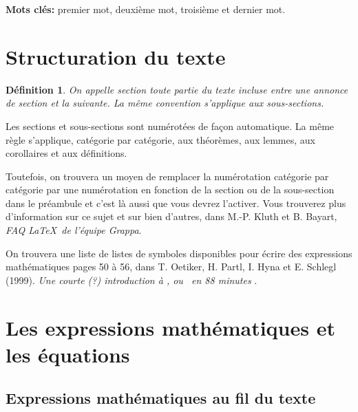 \documentclass[10pt]{article}
\newtheorem{definition}{Définition}
\begin{document}
\textbf{Mots clés: } premier mot, deuxième mot, troisième et dernier mot.

\bigskip

\hypertarget{structuration-du-texte}{%
\section{\texorpdfstring{Structuration du texte
\label{sec1}}{Structuration du texte }}\label{structuration-du-texte}}

\begin{definition}
On appelle section toute partie du texte incluse entre une annonce de section et la suivante. La même convention s'applique aux sous-sections.
\end{definition}

Les sections et sous-sections sont numérotées de façon automatique. La
même règle s'applique, catégorie par catégorie, aux théorèmes, aux
lemmes, aux corollaires et aux définitions.

Toutefois, on trouvera un moyen de remplacer la numérotation catégorie
par catégorie par une numérotation en fonction de la section ou de la
sous-section dans le préambule et c'est là aussi que vous devrez
l'activer. Vous trouverez plus d'information sur ce sujet et sur bien
d'autres, dans M.-P. Kluth et B. Bayart,
\emph{FAQ \LaTeX~de l'équipe Grappa}\cite{faq}.

On trouvera une liste de listes de symboles disponibles pour écrire des
expressions mathématiques pages 50 à 56, dans T. Oetiker, H. Partl, I.
Hyna et E. Schlegl (1999).
\emph{Une courte (?) introduction à \LaTeXe, ou  \LaTeXe~en 88 minutes}
\cite{oeti}.

\hypertarget{les-expressions-mathematiques-et-les-equations}{%
\section{\texorpdfstring{Les expressions mathématiques et les équations
\label{sec2}}{Les expressions mathématiques et les équations }}\label{les-expressions-mathematiques-et-les-equations}}

\hypertarget{expressions-mathematiques-au-fil-du-texte}{%
\subsection{\texorpdfstring{Expressions mathématiques au fil du texte
\label{fil}}{Expressions mathématiques au fil du texte }}\label{expressions-mathematiques-au-fil-du-texte}}
\end{document}
